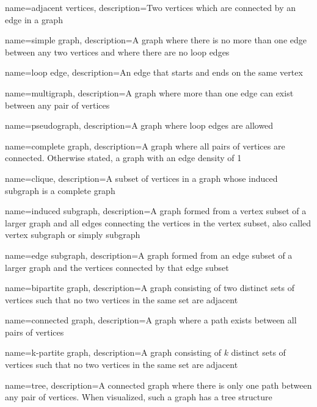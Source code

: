 {
    name={adjacent vertices},
    description={Two vertices which are connected by an edge in a graph}
}

{
    name={simple graph},
    description={A graph where there is no more than one edge between any two vertices and where there are no loop edges}
}

{
    name={loop edge},
    description={An edge that starts and ends on the same vertex}
}

{
    name={multigraph},
    description={A graph where more than one edge can exist between any pair of vertices}
}

{
    name={pseudograph},
    description={A graph where loop edges are allowed}
}

{
    name={complete graph},
    description={A graph where all pairs of vertices are connected. Otherwise stated, a graph with an edge density of 1}
}

{
    name={clique},
    description={A subset of vertices in a graph whose induced subgraph is a complete graph}
}

{
    name={induced subgraph},
    description={A graph formed from a vertex subset of a larger graph and all edges connecting the vertices in the vertex subset, also called vertex subgraph or simply subgraph}
}

{
    name={edge subgraph},
    description={A graph formed from an edge subset of a larger graph and the vertices connected by that edge subset}
}

{
    name={bipartite graph},
    description={A graph consisting of two distinct sets of vertices such that no two vertices in the same set are adjacent}
}

{
    name={connected graph},
    description={A graph where a path exists between all pairs of vertices}
}

{
    name={k-partite graph},
    description={A graph consisting of $k$ distinct sets of vertices such that no two vertices in the same set are adjacent}
}

{
    name={tree},
    description={A connected graph where there is only one path between any pair of vertices. When visualized, such a graph has a tree structure}
}

